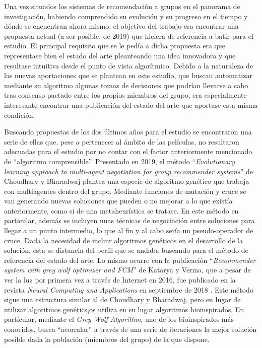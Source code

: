 Una vez situados los sistemas de recomendación a grupos en el panorama de investigación, habiendo comprendido su evolución y su progreso en el tiempo y dónde se encuentran ahora mismo, el objetivo del trabajo era encontrar una propuesta actual (a ser posible, de 2019) que hiciera de referencia a batir para el estudio. El principal requisito que se le pedía a dicha propuesta era que representase bien el estado del arte pleanteando una idea innovadora y que resultase intuitiva desde el punto de vista algorítmico. Debido a la naturaleza de las nuevas aportaciones que se plantean en este estudio, que buscan automatizar mediante su algoritmo algunas tomas de decisiones que podrían llevarse a cabo tras consenso pactado entre los propios miembros del grupo, era especialmente interesante encontrar una publicación del estado del arte que aportase esta misma condición.

Buscando propuestas de los dos últimos años para el estudio se encontraron una serie de ellas que, pese a pertenecer al ámbito de las películas, no resultaron adecuadas para el estudio por no contar con el factor anteriormente mencionado de ``algoritmo comprensible''. Presentado en 2019, el método ``\textit{Evolutionary learning approach to multi-agent negotiation for group recommender systems}'' de Choudhary y Bharadwaj \cite{multiagent} plantea una especie de algoritmo genético que trabaja con multiagentes dentro del grupo. Mediante funciones de mutación y cruce se van generando nuevas soluciones que pueden o no mejorar a lo que existía anteriormente, como si de una metaheurística se tratase. En este método en particular, además se incluyen unas técnicas de negociación entre soluciones para llegar a un punto intermedio, lo que al fin y al cabo sería un pseudo-operador de cruce. Dada la necesidad de incluir algoritmos genéticos en el desarrollo de la solución, esta se distancia del perfil que se andaba buscando para el método de referencia del estado del arte. Lo mismo ocurre con la publicación ``\textit{Recommender system with grey wolf optimizer and FCM}'' de Katarya y Verma, que a pesar de ver la luz por primera vez a través de Internet en 2016, fue publicado en la revista \textit{Neural Computing and Applications} en septiembre de 2018 \cite{wolf-recommender}. Este método sigue una estructura similar al de Choudhary y Bharadwaj, pero en lugar de utilizar algoritmos genétics¡os utiliza en su lugar algoritmos bioinspirados. En particular, mediante el \textit{Grey Wolf Algorithm}, uno de los bioinspirados más conocidos, busca ``acorralar'' a través de una serie de iteraciones la mejor solución posible dada la población (miembros del grupo) de la que dispone.

